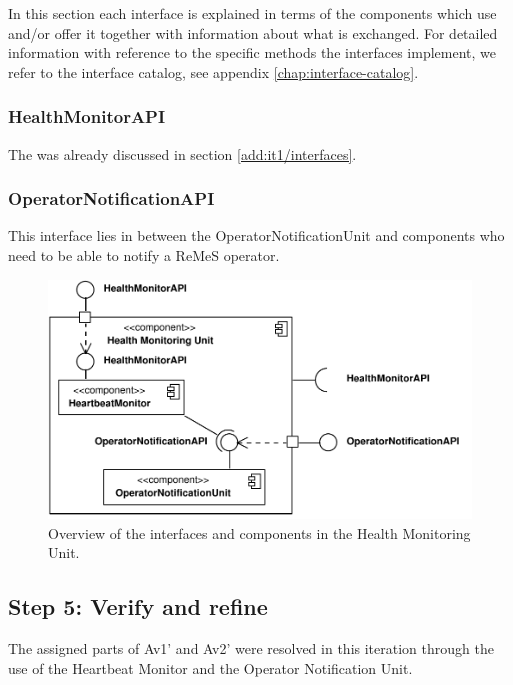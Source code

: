 \npar In this section each interface is explained in terms of the components
which use and/or offer it together with information about what is exchanged. For
detailed information with reference to the specific methods the interfaces
implement, we refer to the interface catalog, see appendix
\ref{chap:interface-catalog}.

\subsubsection{HealthMonitorAPI}

\npar The  was already discussed in section
\ref{add:it1/interfaces}.

\subsubsection{OperatorNotificationAPI}

\npar This interface lies in between the OperatorNotificationUnit and components
who need to be able to notify a ReMeS operator. 

\begin{figure}[H]
	\begin{centering}
		\includegraphics[width=\textwidth]{figs/add-it9-interfaces.pdf}
		\caption{Overview of the interfaces and components in the Health Monitoring
		Unit.}
		\label{fig:it9/interfaces}
	\end{centering}
\end{figure}

\subsection{Step 5: Verify and refine}
\label{add:it9/verification}

\npar The assigned parts of Av1' and Av2' were resolved in this iteration
through the use of the Heartbeat Monitor and the Operator Notification Unit.
